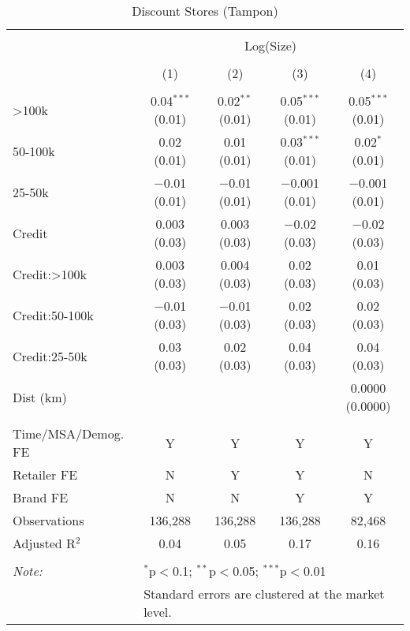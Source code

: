 
\begin{table}[!htbp] \centering 
  \caption{Discount Stores (Tampon)} 
  \label{tab:packageSizeDiscountTamponLiq} 
\begin{tabular}{@{\extracolsep{5pt}}lcccc} 
\\[-1.8ex]\hline 
\hline \\[-1.8ex] 
 & \multicolumn{4}{c}{Log(Size)} \\ 
\\[-1.8ex] & (1) & (2) & (3) & (4)\\ 
\hline \\[-1.8ex] 
 >100k & 0.04$^{***}$ (0.01) & 0.02$^{**}$ (0.01) & 0.05$^{***}$ (0.01) & 0.05$^{***}$ (0.01) \\ 
  50-100k & 0.02 (0.01) & 0.01 (0.01) & 0.03$^{***}$ (0.01) & 0.02$^{*}$ (0.01) \\ 
  25-50k & $-$0.01 (0.01) & $-$0.01 (0.01) & $-$0.001 (0.01) & $-$0.001 (0.01) \\ 
  Credit & 0.003 (0.03) & 0.003 (0.03) & $-$0.02 (0.03) & $-$0.02 (0.03) \\ 
  Credit:>100k & 0.003 (0.03) & 0.004 (0.03) & 0.02 (0.03) & 0.01 (0.03) \\ 
  Credit:50-100k & $-$0.01 (0.03) & $-$0.01 (0.03) & 0.02 (0.03) & 0.02 (0.03) \\ 
  Credit:25-50k & 0.03 (0.03) & 0.02 (0.03) & 0.04 (0.03) & 0.04 (0.03) \\ 
  Dist (km) &  &  &  & 0.0000 (0.0000) \\ 
 \hline \\[-1.8ex] 
Time/MSA/Demog. FE & Y & Y & Y & Y \\ 
Retailer FE & N & Y & Y & N \\ 
Brand FE & N & N & Y & Y \\ 
Observations & 136,288 & 136,288 & 136,288 & 82,468 \\ 
Adjusted R$^{2}$ & 0.04 & 0.05 & 0.17 & 0.16 \\ 
\hline 
\hline \\[-1.8ex] 
\textit{Note:}  & \multicolumn{4}{l}{$^{*}$p$<$0.1; $^{**}$p$<$0.05; $^{***}$p$<$0.01} \\ 
 & \multicolumn{4}{l}{Standard errors are clustered at the market level.} \\ 
\end{tabular} 
\end{table} 

